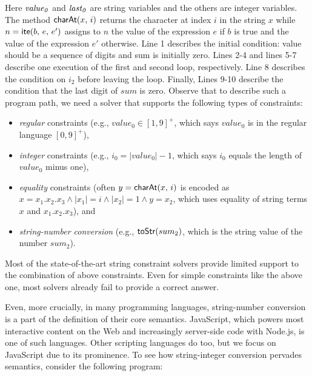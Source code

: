 \documentclass[sigplan,screen]{acmart}
\begin{document}
Here ${\it value_0}$ and ${\it last_0}$ are string variables and the others are integer variables. The method $\mbox{\textsf{charAt}($x$, $i$)}$ returns the character at index $i$ in the string $x$ while $n=\mbox{\textsf{ite}($b$, $e$, $e'$)}$ assigns to $n$ the value of the expression $e$ if $b$ is true and the value of the expression $e'$ otherwise. Line 1 describes the initial condition: \textsf{value} should be a sequence of digits and \textsf{sum} is initially zero. Lines 2-4 and lines 5-7 describe one execution of the first and second loop, respectively. Line 8 describes the condition on $i_2$ before leaving the loop. Finally, Lines 9-10 describe the condition that the last digit of $sum$ is zero. Observe that to describe such a program path, we need a solver that supports the following types of constraints:
\begin{itemize}
	\item \emph{regular} constraints (e.g., $value_0 \in [1,9]^+$, which says $value_0$ is in the regular language $[0,9]^+$),
	\item \emph{integer} constraints (e.g., $i_0 = |value_0| -1$, which says $i_0$ equals the length of $value_0$ minus one),
	\item \emph{equality} constraints (often $y=\mbox{\textsf{charAt}($x$, $i$)}$ is encoded as $x=x_1.x_2.x_3 \wedge |x_1| = i \wedge |x_2| =1 \wedge y= x_2$, which uses equality of string terms $x$ and $x_1.x_2.x_3$), and
	\item \emph{string-number conversion} (e.g., $\mbox{\textsf{toStr}($sum_2$)}$, which is the string value of the number $sum_2$).
\end{itemize}


Most of the state-of-the-art string constraint solvers provide   limited support to the combination of above constraints. Even for simple constraints like the above one, most solvers already fail to provide a correct answer. 


Even, more crucially, in many programming languages, string-number conversion is a part of the definition of their core semantics. 
 JavaScript, which powers most interactive content on the Web and increasingly server-side code with Node.js, is one of such languages. Other scripting languages do too, but we focus on JavaScript due to its prominence. To see how string-integer conversion pervades semantics, consider the following program:
\end{document}
